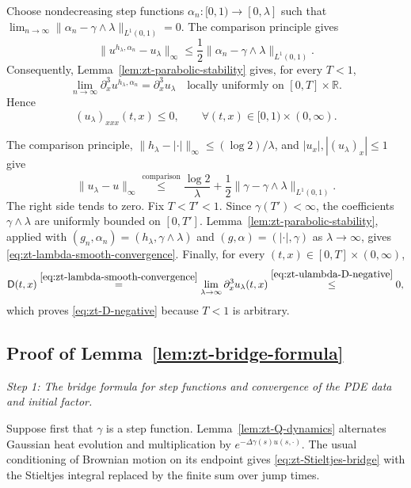 \documentclass[10pt]{amsart}
\theoremstyle{definition}
\theoremstyle{remark}
\numberwithin{equation}{section}
\newcommand{\R}{\mathbb R}
\newcommand{\1}{\mathbf 1}
\newcommand{\stackref}[2]{\stackrel{#2}{#1}}
\begin{document}
Choose nondecreasing step functions $\alpha_n:[0,1)\to[0,\lambda]$ such that $\lim_{n\to\infty}\|\alpha_n-\gamma\wedge\lambda\|_{L^1(0,1)}=0$. The comparison principle gives
\begin{equation*}
 \|u^{h_\lambda,\alpha_n}-u_\lambda\|_\infty
 \leq\frac12\|\alpha_n-\gamma\wedge\lambda\|_{L^1(0,1)}.
\end{equation*}
Consequently, Lemma~\ref{lem:zt-parabolic-stability} gives, for every $T<1$,
\begin{equation*}
 \lim_{n\to\infty}\partial_x^3u^{h_\lambda,\alpha_n}
 =\partial_x^3u_\lambda
 \quad\text{locally uniformly on }[0,T]\times\R.
\end{equation*}
Hence
\begin{equation}
 (u_\lambda)_{xxx}(t,x)\leq0,
 \qquad \forall (t,x)\in[0,1)\times(0,\infty).
 \label{eq:zt-ulambda-D-negative}
\end{equation}

The comparison principle, $\|h_\lambda-|\cdot|\|_\infty\leq(\log2)/\lambda$, and $|u_x|,|(u_\lambda)_x|\leq1$ give
\begin{equation*}
 \|u_\lambda-u\|_\infty
 \stackref{\leq}{\text{comparison}}
 \frac{\log2}{\lambda}
 +\frac12\|\gamma-\gamma\wedge\lambda\|_{L^1(0,1)}.
\end{equation*}
The right side tends to zero. Fix $T<T'<1$. Since $\gamma(T')<\infty$, the coefficients $\gamma\wedge\lambda$ are uniformly bounded on $[0,T']$. Lemma~\ref{lem:zt-parabolic-stability}, applied with $(g_n,\alpha_n)=(h_\lambda,\gamma\wedge\lambda)$ and $(g,\alpha)=(|\cdot|,\gamma)$ as $\lambda\to\infty$, gives \eqref{eq:zt-lambda-smooth-convergence}. Finally, for every $(t,x)\in[0,T]\times(0,\infty)$,
\begin{equation*}
 \mathsf D(t,x)
 \stackref{=}{\eqref{eq:zt-lambda-smooth-convergence}}
 \lim_{\lambda\to\infty}\partial_x^3u_\lambda(t,x)
 \stackref{\leq}{\eqref{eq:zt-ulambda-D-negative}}0,
\end{equation*}
which proves \eqref{eq:zt-D-negative} because $T<1$ is arbitrary.

\subsection{Proof of Lemma~\ref{lem:zt-bridge-formula}}\label{a.pf.lem:zt-bridge-formula}

\noindent\emph{Step 1: The bridge formula for step functions and convergence of the PDE data and initial factor.}

Suppose first that $\gamma$ is a step function. Lemma~\ref{lem:zt-Q-dynamics} alternates Gaussian heat evolution and multiplication by $e^{-\Delta\gamma(s)u(s,\cdot)}$. The usual conditioning of Brownian motion on its endpoint gives \eqref{eq:zt-Stieltjes-bridge} with the Stieltjes integral replaced by the finite sum over jump times.
\end{document}
